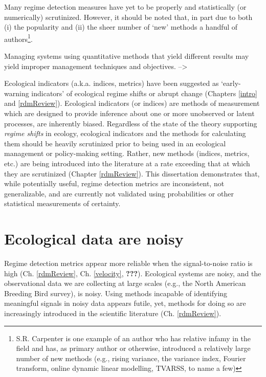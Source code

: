 \documentclass[12pt,twoside,openany]{reedthesis}
\begin{document}
Many regime detection measures have yet to be properly and statistically
(or numerically) scrutinized. However, it should be noted that, in part
due to both (i) the popularity and (ii) the sheer number of `new'
methods a handful of authors\footnote{S.R. Carpenter is one example of
  an author who has relative infamy in the field and has, as primary
  author or otherwise, introduced a relatively large number of new
  methods (e.g., rising variance, the variance index, Fourier transform,
  online dynamic linear modelling, TVARSS, to name a few)}.

Managing systems using quantitative methods that yield different results
may yield improper management techniques and objectives.
--\textgreater{}

Ecological indicators (a.k.a. indices, metrics) have been suggested as
`early-warning indicators' of ecological regime shifts or abrupt change
(Chapters \ref{intro} and \ref{rdmReview}). Ecological indicators (or
indices) are methods of measurement which are designed to provide
inference about one or more unobserved or latent processes, are
inherently biased. Regardless of the state of the theory supporting
\emph{regime shifts} in ecology, ecological indicators and the methods
for calculating them should be heavily scrutinized prior to being used
in an ecological management or policy-making setting. Rather, new
methods (indices, metrics, etc.) are being introduced into the
literature at a rate exceeding that at which they are scrutinized
(Chapter \ref{rdmReview}). This dissertation demonstrates that, while
potentially useful, regime detection metrics are inconsistent, not
generalizable, and are currently not validated using probabilities or
other statistical measurements of certainty.

\section{Ecological data are noisy}\label{ecological-data-are-noisy}

Regime detection metrics appear more reliable when the signal-to-noise
ratio is high (Ch. \ref{rdmReview}, Ch. \ref{velocity}, {\textbf{???}}).
Ecological systems are noisy, and the observational data we are
collecting at large scales (e.g., the North American Breeding Bird
survey), is noisy. Using methods incapable of identifying meaningful
signals in noisy data appears futile, yet, methods for doing so are
increasingly introduced in the scientific literature (Ch.
\ref{rdmReview}).
\end{document}
